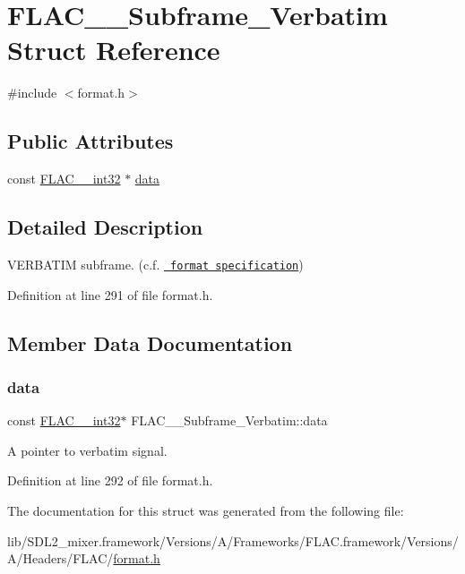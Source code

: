 \hypertarget{struct_f_l_a_c_____subframe___verbatim}{}\section{F\+L\+A\+C\+\_\+\+\_\+\+Subframe\+\_\+\+Verbatim Struct Reference}
\label{struct_f_l_a_c_____subframe___verbatim}


{\ttfamily \#include $<$format.\+h$>$}

\subsection*{Public Attributes}
\begin{DoxyCompactItemize}
\item 
const \mbox{\hyperlink{ordinals_8h_a33fd77bfe6d685541a0c034a75deccdc}{F\+L\+A\+C\+\_\+\+\_\+int32}} $\ast$ \mbox{\hyperlink{struct_f_l_a_c_____subframe___verbatim_a6abc78689650804550ac517ada884584}{data}}
\end{DoxyCompactItemize}


\subsection{Detailed Description}
V\+E\+R\+B\+A\+T\+IM subframe. (c.\+f. \href{../format.html\#subframe_verbatim}{\texttt{ format specification}}) 

Definition at line 291 of file format.\+h.



\subsection{Member Data Documentation}
\mbox{\label{struct_f_l_a_c_____subframe___verbatim_a6abc78689650804550ac517ada884584}} 
\subsubsection{\texorpdfstring{data}{data}}
{\footnotesize\ttfamily const \mbox{\hyperlink{ordinals_8h_a33fd77bfe6d685541a0c034a75deccdc}{F\+L\+A\+C\+\_\+\+\_\+int32}}$\ast$ F\+L\+A\+C\+\_\+\+\_\+\+Subframe\+\_\+\+Verbatim\+::data}

A pointer to verbatim signal. 

Definition at line 292 of file format.\+h.



The documentation for this struct was generated from the following file\+:\begin{DoxyCompactItemize}
\item 
lib/\+S\+D\+L2\+\_\+mixer.\+framework/\+Versions/\+A/\+Frameworks/\+F\+L\+A\+C.\+framework/\+Versions/\+A/\+Headers/\+F\+L\+A\+C/\mbox{\hyperlink{format_8h}{format.\+h}}\end{DoxyCompactItemize}
